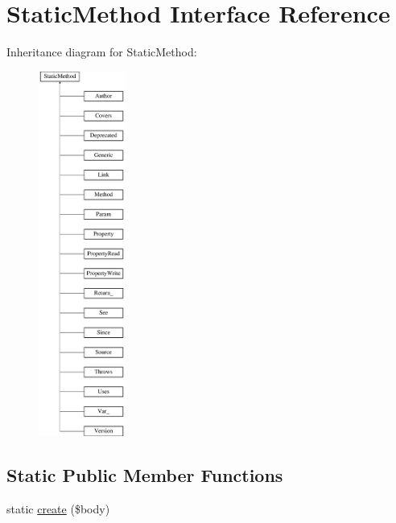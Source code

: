 \hypertarget{interfacephp_documentor_1_1_reflection_1_1_doc_block_1_1_tags_1_1_factory_1_1_static_method}{}\section{Static\+Method Interface Reference}
\label{interfacephp_documentor_1_1_reflection_1_1_doc_block_1_1_tags_1_1_factory_1_1_static_method}
Inheritance diagram for Static\+Method\+:\begin{figure}[H]
\begin{center}
\leavevmode
\includegraphics[height=12.000000cm]{interfacephp_documentor_1_1_reflection_1_1_doc_block_1_1_tags_1_1_factory_1_1_static_method}
\end{center}
\end{figure}
\subsection*{Static Public Member Functions}
\begin{DoxyCompactItemize}
\item 
static \mbox{\hyperlink{interfacephp_documentor_1_1_reflection_1_1_doc_block_1_1_tags_1_1_factory_1_1_static_method_a322bfa4cad4fbe7364f4ab65c8f8588c}{create}} (\$body)
\end{DoxyCompactItemize}


